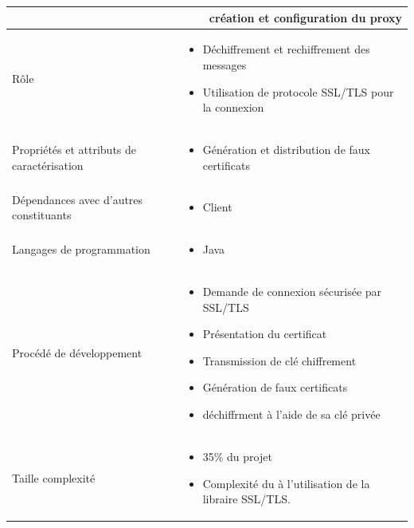 \documentclass[a4paper,11pt,french]{article}
\begin{document}
\begin{center}
        \vspace*{0.7cm}
        \begin{tabularx}{16cm}{|l|X|}
        \hline
        \multicolumn{2}{|r|}{\textbf{création et configuration du proxy}}\\
        \hline
        R\^ole &  \begin{itemize}\item Déchiffrement et rechiffrement des messages
        \item Utilisation de protocole SSL/TLS pour la connexion \end{itemize}\\
        \hline
        Propriétés et attributs de caractérisation & \begin{itemize} \item Génération et distribution de faux certificats \end{itemize}\\
        \hline
        Dépendances avec d'autres constituants & \begin{itemize}\item Client \end{itemize}\\
        \hline
        Langages de programmation & \begin{itemize} \item Java \end{itemize}\\
        \hline
        Procédé de développement & \begin{itemize}\item Demande de connexion sécurisée par SSL/TLS \item Présentation du certificat \item Transmission de clé chiffrement \item Génération de faux certificats \item déchiffrment à l'aide de sa clé privée \end{itemize}\\
        \hline
        Taille complexité & \begin{itemize}\item 35\% du projet \item Complexité du à l'utilisation de la libraire SSL/TLS.\end{itemize}\\
        \hline
        \end{tabularx}
\end{center}
\end{document}

